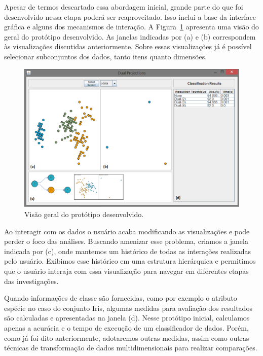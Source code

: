 Apesar de termos descartado essa abordagem inicial, grande
parte do que foi desenvolvido nessa etapa poderá ser
reaproveitado. Isso inclui a base da interface gráfica e
alguns dos mecanismos de interação. A
Figura~\ref{fig:dual-main} apresenta uma visão do geral do
protótipo desenvolvido. As janelas indicadas por (a) e (b)
correspondem às visualizações discutidas anteriormente.
Sobre essas visualizações já é possível selecionar
subconjuntos dos dados, tanto itens quanto dimensões. 

\begin{figure}[h!]
    \centering
    \includegraphics[width=16cm]{images/dual-main.png}
    \caption{Visão geral do protótipo desenvolvido.}
    \label{fig:dual-main}
\end{figure}

Ao interagir com os dados o usuário acaba modificando as
visualizações e pode perder o foco das análises. Buscando
amenizar esse problema, criamos a janela indicada por
(c), onde mantemos um histórico de todas as interações
realizadas pelo usuário. Exibimos esse histórico em uma
estrutura hierárquica e permitimos que o usuário interaja
com essa visualização para navegar em diferentes etapas das
investigações. 

Quando informações de classe são fornecidas, como por
exemplo o atributo espécie no caso do conjunto Iris, algumas
medidas para avaliação dos resultados são calculadas e
apresentadas na janela (d). Nesse protótipo inicial,
calculamos apenas a acurácia e o tempo de execução de um
classificador de dados. Porém, como já foi dito
anteriormente, adotaremos outras medidas, assim como outras
técnicas de transformação de dados multidimensionais para
realizar comparações. 

